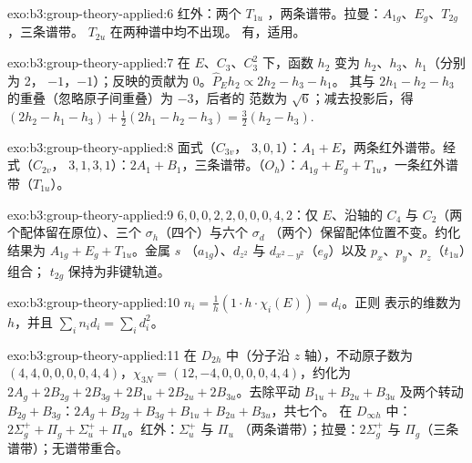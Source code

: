 \begin{solution}{exo:b3:group-theory-applied:6}
红外：两个 $T_{1u}$ ，两条谱带。拉曼：$A_{1g}$、$E_g$、$T_{2g}$，三条谱带。
$T_{2u}$ 在两种谱中均不出现。 有，适用。
\end{solution}

\begin{solution}{exo:b3:group-theory-applied:7}
在 $E$、$C_3$、$C_3^2$ 下，函数 $h_2$ 变为 $h_2$、$h_3$、$h_1$（分别为 2，
$-1$，$-1$）；反映的贡献为 0。$\hat P_Eh_2 \propto 2h_2 - h_3 - h_1$。
其与 $2h_1 - h_2 - h_3$ 的重叠（忽略原子间重叠）为 $-3$，后者的
范数为 $\sqrt6$；减去投影后，得 $(2h_2 - h_1 - h_3) +
\frac12(2h_1 - h_2 - h_3) = \frac32(h_2 - h_3)$.
\end{solution}

\begin{solution}{exo:b3:group-theory-applied:8}
面式（$C_{3v}$， $3, 0, 1$）：$A_1 + E$，两条红外谱带。经式（$C_{2v}$，
 $3, 1, 3, 1$）：$2A_1 + B_1$，三条谱带。（$O_h$）：$A_{1g} + E_g
+ T_{1u}$，一条红外谱带（$T_{1u}$）。
\end{solution}

\begin{solution}{exo:b3:group-theory-applied:9}
 $6, 0, 0, 2, 2, 0, 0, 0, 4, 2$：仅 $E$、沿轴的 $C_4$ 与
$C_2$（两个配体留在原位）、三个 $\sigma_h$（四个）与六个 $\sigma_d$
（两个）保留配体位置不变。约化结果为 $A_{1g} + E_g + T_{1u}$。金属 $s$
（$a_{1g}$）、$d_{z^2}$ 与 $d_{x^2-y^2}$（$e_g$）以及 $p_x$、$p_y$、$p_z$（$t_{1u}$）组合；
$t_{2g}$ 保持为非键轨道。
\end{solution}

\begin{solution}{exo:b3:group-theory-applied:10}
$n_i = \frac1h(1\cdot h\cdot\chi_i(E)) = d_i$。正则
表示的维数为 $h$，并且 $\sum_in_id_i = \sum_id_i^2$。
\end{solution}

\begin{solution}{exo:b3:group-theory-applied:11}
在 $D_{2h}$ 中（分子沿 $z$ 轴），不动原子数为 $(4, 4, 0, 0, 0, 0, 4, 4)$，$\chi_{3N}
= (12, -4, 0, 0, 0, 0, 4, 4)$，约化为 $2A_g + 2B_{2g} + 2B_{3g} + 2B_{1u} + 2B_{2u}
+ 2B_{3u}$。去除平动 $B_{1u} + B_{2u} + B_{3u}$ 及两个转动
$B_{2g} + B_{3g}$：$2A_g + B_{2g} + B_{3g} + B_{1u} + B_{2u} + B_{3u}$，共七个。
在 $D_{\infty h}$ 中：$2\Sigma_g^+ + \Pi_g + \Sigma_u^+ + \Pi_u$。红外：$\Sigma_u^+$ 与 $\Pi_u$
（两条谱带）；拉曼：$2\Sigma_g^+$ 与 $\Pi_g$（三条谱带）；无谱带重合。
\end{solution}


